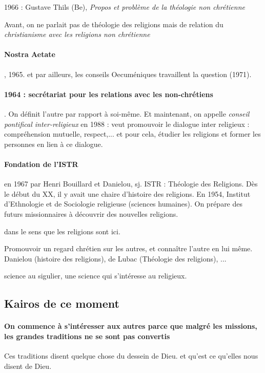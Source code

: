 \item 1966 : Gustave Thils (Be), \textit{Propos et problème de la théologie non chrétienne} 

\ei 
Avant, on ne parlait pas de théologie des religions mais de relation du \textit{christianisme avec les religions non chrétienne}

\paragraph{Nostra Aetate}, 1965. et par ailleurs, les conseils Oecuméniques travaillent la question (1971).
\paragraph{1964 : secrétariat pour les relations avec les non-chrétiens}. On définit l'autre par rapport à soi-même. Et maintenant, on appelle \textit{conseil pontifical inter-religieux} en 1988 : veut promouvoir le dialogue inter religieux : compréhension mutuelle, respect,... et pour cela, étudier les religions et former les personnes en lien à ce dialogue.

\paragraph{Fondation de l'ISTR} en 1967 par Henri Bouillard et Danielou, sj. ISTR : Théologie des Religions. Dès le début du XX, il y avait une chaire d'histoire des religions. En 1954, Institut d'Ethnologie et de Sociologie religieuse (sciences humaines). On prépare des futurs missionnaires à découvrir des nouvelles religions. 

 dans le sens que les religions sont ici.

Promouvoir un regard chrétien sur les autres, et connaître l'autre en lui même. Danielou (histoire des religions), de Lubac (Théologie des religions), ...
\begin{Def}
science au sigulier, une science qui s'intéresse au religieux. 
\end{Def}

\subsection{Kairos de ce moment}
\paragraph{On commence à s'intéresser aux autres parce que malgré les missions, les grandes traditions ne se sont pas convertis}
Ces traditions disent quelque chose du dessein de Dieu. et qu'est ce qu'elles nous disent de Dieu.

